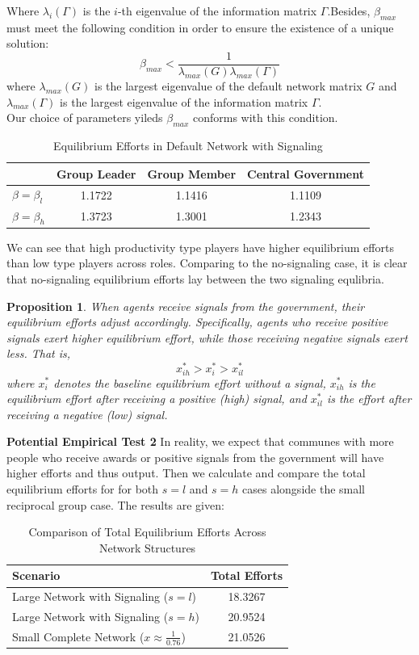 \documentclass[12pt]{article}
\newtheorem{proposition}{Proposition}
\begin{document}
  Where $\lambda_i(\Gamma)$ is the $i$-th eigenvalue of the information matrix $\Gamma$.Besides, $\beta_{max}$ must meet the following condition in order to ensure the existence of a unique solution:
\[
\beta_{max} < \frac{1}{\lambda_{max}(G)\lambda_{max}(\Gamma)}
\] 
  where $\lambda_{max}(G)$ is the largest eigenvalue of the default network matrix $G$  and $\lambda_{max}(\Gamma)$ is the largest eigenvalue of the information matrix $\Gamma$.\\
Our choice of parameters yileds $\beta_{max}$ conforms with this condition. \\
\begin{table}[H]
  \centering
  \caption{Equilibrium Efforts in Default Network with Signaling}
  \begin{tabular}{lccc}
  \toprule
   & \textbf{Group Leader} & \textbf{Group Member} & \textbf{Central Government} \\
  \midrule
  \(\beta = \beta_l\) & 1.1722 & 1.1416 & 1.1109 \\
  \(\beta = \beta_h\) & 1.3723 & 1.3001 & 1.2343 \\
  \bottomrule
  \end{tabular}
  \end{table}
  We can see that high productivity type players have higher equilibrium efforts than low type players across roles. Comparing to the no-signaling case, it is clear that no-signaling equilibrium efforts lay between the two signaling equlibria. 
  \begin{proposition}
    When agents receive signals from the government, their equilibrium efforts adjust accordingly. Specifically, agents who receive positive signals exert higher equilibrium effort, while those receiving negative signals exert less. That is,
    \[
    x^*_{ih} > x^*_i > x^*_{il}
    \]
    where \( x^*_i \) denotes the baseline equilibrium effort without a signal, \( x^*_{ih} \) is the equilibrium effort after receiving a positive (high) signal, and \( x^*_{il} \) is the effort after receiving a negative (low) signal.
    \end{proposition}
\textbf{Potential Empirical Test 2} In reality, we expect that communes with more people who receive awards or positive signals from the government will have higher efforts and thus output.
    Then we calculate and compare the total equilibrium efforts for for both $s=l$ and $s=h$ cases alongside the small reciprocal group case. The results are given:
\begin{table}[H]
  \centering
  \caption{Comparison of Total Equilibrium Efforts Across Network Structures}
  \begin{tabular}{l c}
  \toprule
  \textbf{Scenario} & \textbf{Total Efforts} \\
  \midrule
  Large Network with Signaling (\( s = l \)) & 18.3267 \\
  Large Network with Signaling (\( s = h \)) & 20.9524 \\
  Small Complete Network (\( x \approx \frac{1}{0.76} \)) & 21.0526 \\
  \bottomrule
  \end{tabular}
  \end{table}
\end{document}
